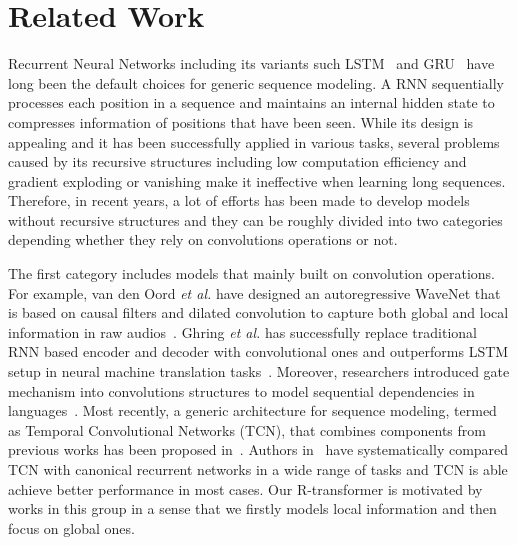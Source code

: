 \documentclass{article} \usepackage{iclr2019_conference,times}
\begin{document}
 \section{Related Work}
Recurrent Neural Networks including its variants such LSTM~\citep{hochreiter1997long} and GRU~\citep{cho2014learning} have long been the default choices for generic sequence modeling. A RNN sequentially processes each position in a sequence and maintains an internal hidden state to compresses information of positions that have been seen. While its design is appealing and it has been successfully applied in various tasks, several problems caused by its recursive structures including low computation efficiency and gradient exploding or vanishing make it ineffective when learning long sequences. Therefore, in recent years, a lot of efforts has been made to develop models without recursive structures and they can be roughly divided into two categories depending whether they rely on convolutions operations or not.

The first category includes models that mainly built on convolution operations. For example, van den Oord {\it et al.} have designed an autoregressive WaveNet that is based on causal filters and dilated convolution to capture both global and local information in raw audios~\citep{van2016wavenet}. Ghring {\it et al.} has successfully replace traditional RNN based encoder and decoder with convolutional ones and outperforms LSTM setup in neural machine translation tasks~\citep{gehring2017convolutional,gehring2016convolutional}. Moreover, researchers introduced gate mechanism into convolutions structures to model sequential dependencies in languages~\citep{dauphin2017language}. Most recently, a generic architecture  for sequence modeling, termed as Temporal Convolutional Networks (TCN), that combines components from previous works has been proposed in~\citep{bai2018empirical}. Authors in~\citep{bai2018empirical} have systematically compared TCN with canonical recurrent networks in a wide range of tasks and TCN is able achieve better performance in most cases. Our R-transformer is motivated by works in this group in a sense that we firstly models local information and then focus on global ones.
\end{document}
